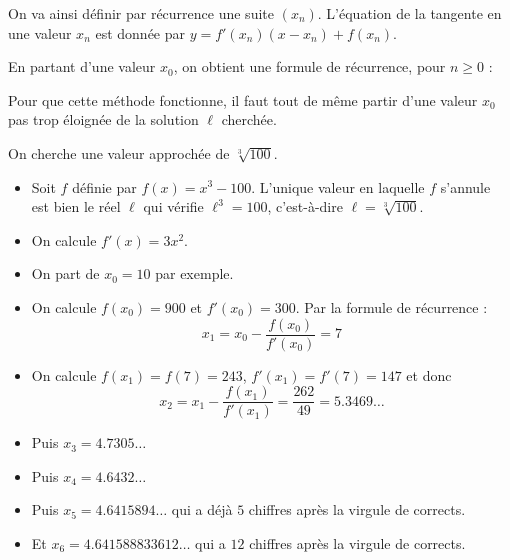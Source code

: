 \documentclass[11pt,class=report,crop=false]{standalone}
\begin{document}
On va ainsi définir par récurrence une suite $(x_n)$.  
L'équation de la tangente en une valeur $x_n$ est donnée par 
$y = f'(x_n)(x-x_n)+f(x_n)$. %


En partant d'une valeur $x_0$, on obtient une formule de récurrence, pour $n\ge0$  :


Pour que cette méthode fonctionne, il faut tout de même partir d'une valeur $x_0$ pas trop éloignée de la solution $\ell$ cherchée.

\begin{exemple}
On cherche une valeur approchée de $\sqrt[3]{100}$.

\begin{itemize}
  \item Soit $f$ définie par $f(x)=x^3-100$. L'unique valeur en laquelle $f$ s'annule est bien le réel $\ell$ qui vérifie $\ell^3=100$, c'est-à-dire $\ell = \sqrt[3]{100}$.
  
  \item On calcule $f'(x) = 3x^2$.
  
  \item On part de $x_0=10$ par exemple.
  
  \item On calcule $f(x_0) = 900$ et $f'(x_0) = 300$. Par la formule de récurrence :
  $$x_1 = x_0 - \frac{f(x_0)}{f'(x_0)} = 7$$
  
  \item On calcule $f(x_1) = f(7) = 243$, $f'(x_1) = f'(7) = 147$ et donc
  $$x_2 = x_1 - \frac{f(x_1)}{f'(x_1)} = \frac{262}{49} = 5.3469\ldots$$ 
  
  \item Puis $x_3 = 4.7305\ldots$
  
  \item Puis $x_4 = 4.6432\ldots$ 
  
  \item Puis $x_5 = 4.6415894\ldots$   qui a déjà $5$ chiffres après la virgule de corrects.
  
  \item Et $x_6 = 4.641588833612\ldots$  qui a $12$ chiffres après la virgule de corrects. 
\end{itemize}


\end{exemple}
\end{document}
